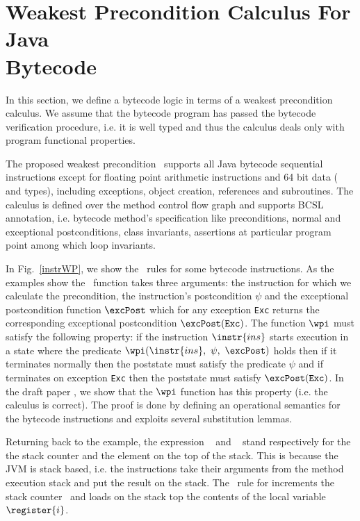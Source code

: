 
\section{Weakest Precondition Calculus For Java \\  Bytecode}\label{wpbc}
In this section, we define a bytecode logic in terms of a weakest precondition calculus.
We assume that the bytecode program has passed the bytecode verification procedure, i.e. it is well typed and
 thus the calculus deals only with program functional properties. 

The proposed weakest precondition \wpi \ supports all Java bytecode sequential instructions except for floating point
 arithmetic instructions and 64 bit data ( and  types), including exceptions, object creation,
 references and subroutines. The calculus is defined over the method control flow graph and supports BCSL annotation,
 i.e. bytecode method's specification like preconditions, normal and exceptional postconditions, class invariants,
 assertions at particular program point among which loop invariants.

 In Fig.~\ref{instrWP}, we show the \wpi \ rules for some bytecode instructions. 
As the examples show the \wpi \ function takes three arguments:
the instruction for which we calculate the precondition, 
the instruction's postcondition $\psi$ and the exceptional postcondition function $\excPost$ which for any exception \texttt{Exc} returns the
corresponding exceptional postcondition $\excPost(\texttt{Exc})$. 
The function $\wpi$ must satisfy the following property: if the instruction $\instr{ins}$ starts execution in a state where the predicate
$\wpi(\instr{ins}, \ \psi, \ \excPost)$ holds then if it terminates normally then the poststate must satisfy the predicate $\psi$  
and if terminates on exception \texttt{Exc} then  the poststate must satisfy $\excPost(\texttt{Exc})$.
 In the draft paper \cite{JBL05MP}, we show that the $\wpi$ function has this property (i.e. the calculus is correct). The proof is done by defining an operational semantics for the bytecode instructions and exploits several substitution lemmas.

Returning back to the example, the expression \counter~ and  \stack{\counter}~ stand respectively for the the stack counter and the element on the top of the stack.
 This is because the JVM is stack based, i.e. the instructions take their arguments from the method execution stack and 
 put the result on the stack.
 The \wpi \ rule for   increments the stack counter \counter \ and loads on the stack top the contents
 of the local variable $\register{i}$. 

